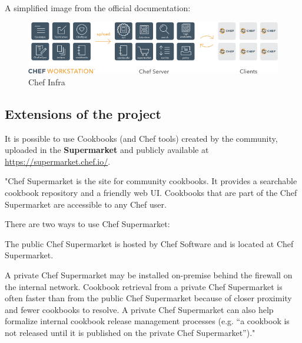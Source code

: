 \documentclass[12pt,a4paper,openright,twoside]{book}
\begin{document}
A simplified image from the official documentation:

\begin{figure}[h]
    \centering
    \includegraphics[width=.8\linewidth]{figures/chef_infra.png}
    \caption{Chef Infra}
    \label{fig:chef-infra-image}
\end{figure}





\subsection{Extensions of the project}
It is possible to use Cookbooks (and Chef tools) created by the community, uploaded in the \textbf{Supermarket} and publicly available at \url{https://supermarket.chef.io/}.


"Chef Supermarket is the site for community cookbooks. It provides a searchable cookbook repository and a friendly web UI. Cookbooks that are part of the Chef Supermarket are accessible to any Chef user.


There are two ways to use Chef Supermarket:


The public Chef Supermarket is hosted by Chef Software and is located at Chef Supermarket.


A private Chef Supermarket may be installed on-premise behind the firewall on the internal network. Cookbook retrieval from a private Chef Supermarket is often faster than from the public Chef Supermarket because of closer proximity and fewer cookbooks to resolve. A private Chef Supermarket can also help formalize internal cookbook release management processes (e.g. “a cookbook is not released until it is published on the private Chef Supermarket”)."\cite{chefSupermarket}
\end{document}
